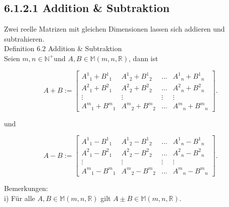 \documentclass[10pt]{article}
\begin{document}
\subsection*{6.1.2.1 Addition \& Subtraktion}
Zwei reelle Matrizen mit gleichen Dimensionen lassen sich addieren und subtrahieren.\\
Definition 6.2 Addition \& Subtraktion\\
Seien $m, n \in \mathbb{N}^{+}$und $A, B \in \mathbb{M}(m, n, \mathbb{R})$, dann ist

\[
A+B:=\left[\begin{array}{llll}
A^{1}{ }_{1}+B^{1}{ }_{1} & A^{1}{ }_{2}+B^{1}{ }_{2} & \ldots & A^{1}{ }_{n}+B^{1}{ }_{n}  \tag{6.4}\\
A^{2}{ }_{1}+B^{2}{ }_{1} & A^{2}{ }_{2}+B^{2}{ }_{2} & \ldots & A^{2}{ }_{n}+B^{2}{ }_{n} \\
\vdots & \vdots & \vdots & \vdots \\
A^{m}{ }_{1}+B^{m}{ }_{1} & A^{m}{ }_{2}+B^{m}{ }_{2} & \ldots & A^{m}{ }_{n}+B^{m}{ }_{n}
\end{array}\right] .
\]

und

\[
A-B:=\left[\begin{array}{llll}
A^{1}{ }_{1}-B^{1}{ }_{1} & A^{1}{ }_{2}-B^{1}{ }_{2} & \ldots & A^{1}{ }_{n}-B^{1}{ }_{n}  \tag{6.5}\\
A^{2}{ }_{1}-B^{2}{ }_{1} & A^{2}{ }_{2}-B^{2}{ }_{2} & \ldots & A^{2}{ }_{n}-B^{2}{ }_{n} \\
\vdots & \vdots & \vdots & \vdots \\
A^{m}{ }_{1}-B^{m}{ }_{1} & A^{m}{ }_{2}-B^{m}{ }_{2} & \ldots & A^{m}{ }_{n}-B^{m}{ }_{n}
\end{array}\right] .
\]

Bemerkungen:\\
i) Für alle $A, B \in \mathbb{M}(m, n, \mathbb{R})$ gilt $A \pm B \in \mathbb{M}(m, n, \mathbb{R})$.
\end{document}
